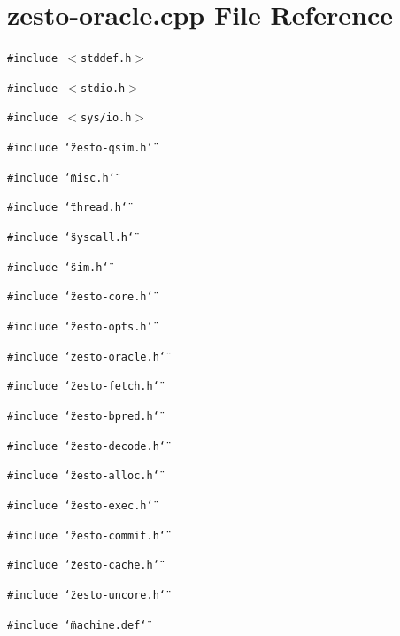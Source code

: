 \section{zesto-oracle.cpp File Reference}
\label{zesto-oracle_8cpp}
{\tt \#include $<$stddef.h$>$}\par
{\tt \#include $<$stdio.h$>$}\par
{\tt \#include $<$sys/io.h$>$}\par
{\tt \#include \char`\"{}zesto-qsim.h\char`\"{}}\par
{\tt \#include \char`\"{}misc.h\char`\"{}}\par
{\tt \#include \char`\"{}thread.h\char`\"{}}\par
{\tt \#include \char`\"{}syscall.h\char`\"{}}\par
{\tt \#include \char`\"{}sim.h\char`\"{}}\par
{\tt \#include \char`\"{}zesto-core.h\char`\"{}}\par
{\tt \#include \char`\"{}zesto-opts.h\char`\"{}}\par
{\tt \#include \char`\"{}zesto-oracle.h\char`\"{}}\par
{\tt \#include \char`\"{}zesto-fetch.h\char`\"{}}\par
{\tt \#include \char`\"{}zesto-bpred.h\char`\"{}}\par
{\tt \#include \char`\"{}zesto-decode.h\char`\"{}}\par
{\tt \#include \char`\"{}zesto-alloc.h\char`\"{}}\par
{\tt \#include \char`\"{}zesto-exec.h\char`\"{}}\par
{\tt \#include \char`\"{}zesto-commit.h\char`\"{}}\par
{\tt \#include \char`\"{}zesto-cache.h\char`\"{}}\par
{\tt \#include \char`\"{}zesto-uncore.h\char`\"{}}\par
{\tt \#include \char`\"{}machine.def\char`\"{}}\par


